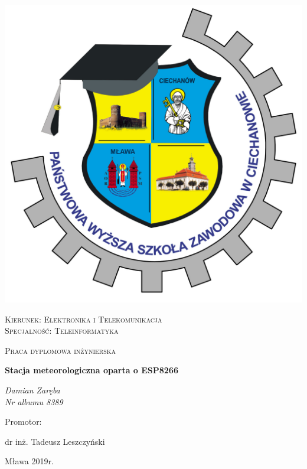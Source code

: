 \documentclass[12pt,a4paper,oneside]{memoir}
\begin{document}
\renewcommand{\maketitle}
{
	\centering
	\includegraphics[scale=0.1]{images/logo.jpg}\par\vspace{1cm}
	{\scshape\LARGE Kierunek: Elektronika i Telekomunikacja\\ Specjalność: Teleinformatyka \par}
	\vspace{1cm}
	{\scshape\Large Praca dyplomowa inżynierska\par}
	\vspace{1.5cm}
	{\huge\bfseries Stacja meteorologiczna oparta o ESP8266\par}
	\vspace{2cm}
	{\Large\itshape Damian Zaręba\\Nr albumu 8389\par}
	\vfill
	Promotor:\par
	dr inż. Tadeusz Leszczyński
	\vfill
	
	{\large Mława 2019r. \par}
}
\maketitle
\thispagestyle{empty}
\newpage
{\tytulyrozdzialow \tableofcontents}
\newpage
\flushleftright
\end{document}
